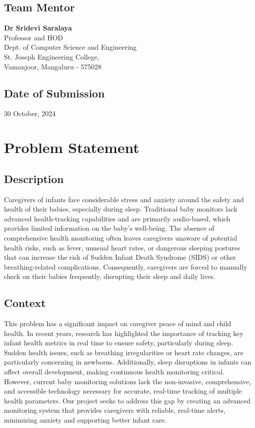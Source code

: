\documentclass[12pt,a4paper]{report}
\begin{document}
\section{Team Mentor}
\textbf{Dr Sridevi Saralaya} \\ Professor and HOD \\ Dept. of Computer Science and Engineering \\ St. Joseph Engineering College, \\ Vamanjoor, Mangaluru - 575028

\section{Date of Submission}
30 October, 2024

\chapter{Problem Statement}

\section{Description}
Caregivers of infants face considerable stress and anxiety around the safety and health of their babies, especially during sleep. Traditional baby monitors lack advanced health-tracking capabilities and are primarily audio-based, which provides limited information on the baby's well-being. The absence of comprehensive health monitoring often leaves caregivers unaware of potential health risks, such as fever, unusual heart rates, or dangerous sleeping postures that can increase the risk of Sudden Infant Death Syndrome (SIDS) or other breathing-related complications. Consequently, caregivers are forced to manually check on their babies frequently, disrupting their sleep and daily lives.

\section{Context}
This problem has a significant impact on caregiver peace of mind and child health. In recent years, research has highlighted the importance of tracking key infant health metrics in real time to ensure safety, particularly during sleep. Sudden health issues, such as breathing irregularities or heart rate changes, are particularly concerning in newborns. Additionally, sleep disruptions in infants can affect overall development, making continuous health monitoring critical. However, current baby monitoring solutions lack the non-invasive, comprehensive, and accessible technology necessary for accurate, real-time tracking of multiple health parameters. Our project seeks to address this gap by creating an advanced monitoring system that provides caregivers with reliable, real-time alerts, minimizing anxiety and supporting better infant care.
\end{document}
